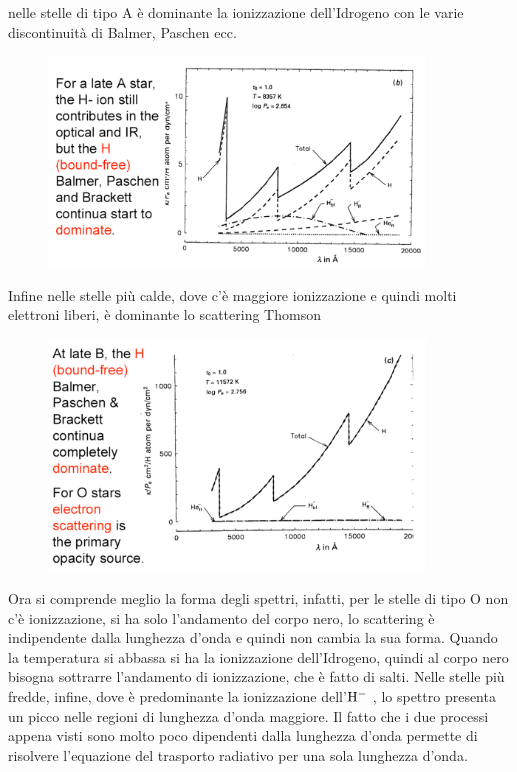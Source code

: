 nelle stelle di tipo A è dominante la ionizzazione dell'Idrogeno con le varie discontinuità di Balmer, Paschen ecc.

\begin{figure}[H]
  \centering
  \includegraphics[width=10cm]{immagini/spettro_stelle_A.png}
\end{figure}

Infine nelle stelle più calde, dove c'è maggiore ionizzazione e quindi molti elettroni liberi, è dominante lo scattering Thomson

\begin{figure}[H]
  \centering
  \includegraphics[width=10cm]{immagini/spettro_stelle_calde.png}
\end{figure}


Ora si comprende meglio la forma degli spettri, infatti, per le stelle di tipo O non c'è ionizzazione, si ha solo l'andamento del corpo nero, lo scattering è indipendente dalla lunghezza d'onda e quindi non cambia la sua forma. Quando la temperatura si abbassa si ha la ionizzazione dell'Idrogeno, quindi al corpo nero bisogna sottrarre l'andamento di ionizzazione, che è fatto di salti. Nelle stelle più fredde, infine, dove è predominante la ionizzazione dell'$\rm H^-$ , lo spettro presenta un picco nelle regioni di lunghezza d'onda maggiore. Il fatto che i due processi appena visti sono molto poco dipendenti dalla lunghezza d'onda permette di risolvere l'equazione del trasporto radiativo per una sola lunghezza d'onda.

